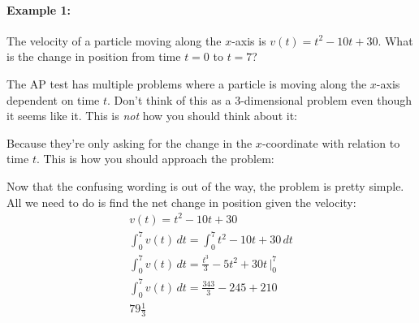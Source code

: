 \documentclass[../revisedmain.tex]{subfiles}
\begin{document}
	\newpage
\paragraph{Example 1:}The velocity of a particle moving along the $x$-axis is $v(t)=t^2-10t+30$. What is the change in position from time $t=0$ to $t=7$?\\\newline\par The AP test has multiple problems where a particle is moving along the $x$-axis dependent on time $t$. Don't think of this as a 3-dimensional problem even though it seems like it. This is \textit{not} how you should think about it:\\\vspace{.125in}
\begin{center}
\end{center}
Because they're only asking for the change in the $x$-coordinate with relation to time $t$. This is how you should approach the problem:
\begin{center}
\end{center}
Now that the confusing wording is out of the way, the problem is pretty simple. All we need to do is find the net change in position given the velocity:
\begin{gather*}
	v(t)=t^2-10t+30\\
	\int_{0}^{7}v(t)\,dt=\int_{0}^{7}t^2-10t+30\,dt\\
	\int_{0}^{7}v(t)\,dt=\frac{t^3}{3}-5t^2+30t\,\Big|_{0}^{7}\\
	\int_{0}^{7}v(t)\,dt=\frac{343}{3}-245+210\\
	79\frac{1}{3}
\end{gather*}
\end{document}
